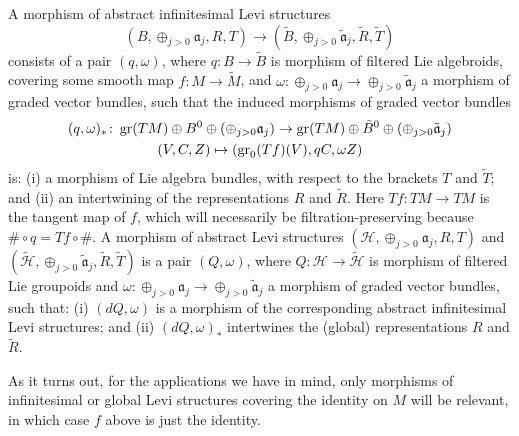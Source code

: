 \documentclass[leqno,12pt]{amsart} %
\begin{document}
A morphism of abstract infinitesimal Levi structures
$$(B, \oplus_{j>0} {\mathfrak a}_j, R, T) \rightarrow
(\tilde B, \oplus_{j>0} \tilde{\mathfrak a}_j, \tilde R, \tilde T)$$ consists of a pair
$(q, \omega)$, where $q \colon B \rightarrow \tilde B$ is morphism of filtered Lie
algebroids, covering some smooth map $f \colon M \rightarrow \tilde M$, and
$\omega \colon \oplus_{j>0}{\mathfrak a}_j \rightarrow \oplus_{j>0}\tilde{\mathfrak a}_j$
a morphism of graded vector bundles, such that the induced morphisms of graded vector
bundles
\begin{gather*}
  (q, \omega)_* \colon \operatorname{\operatorname{gr}}(TM)\oplus B^0 \oplus (\oplus_{j>0}{\mathfrak a}_j)
     \rightarrow \operatorname{\operatorname{gr}}(TM)\oplus \tilde B^0 \oplus (\oplus_{j>0}\tilde{\mathfrak a}_j)\\
  (V, C, Z) \mapsto (\operatorname{\operatorname{gr}}_0(Tf)(V), qC, \omega Z)
\end{gather*}
is: (i) a morphism of Lie algebra bundles, with respect to the brackets $T$ and
$\tilde T$; and (ii) an intertwining of the representations $R$ and $\tilde R$. Here
$Tf \colon TM \rightarrow TM$ is the tangent map of $f$, which will necessarily be
filtration-preserving because $\# \circ q = Tf \circ \#$. A morphism of abstract Levi
structures $({\mathcal H}, \oplus_{j>0}{\mathfrak a}_j, R, T)$ and
$(\tilde {\mathcal H}, \oplus_{j>0}\tilde{\mathfrak a}_j, \tilde R, \tilde T)$ is a pair
$(Q, \omega)$, where $Q \colon {\mathcal H} \rightarrow \tilde {\mathcal H} $ is morphism
of filtered Lie groupoids and
$\omega \colon \oplus_{j>0}{\mathfrak a}_j \rightarrow \oplus_{j>0}\tilde{\mathfrak a}_j$
a morphism of graded vector bundles, such that: (i) $(dQ, \omega)$ is a morphism of the
corresponding abstract infinitesimal Levi structures; and (ii) $(dQ, \omega)_*$
intertwines the (global) representations $R$ and $\tilde R$.

As it turns out, for the applications we have in mind, only morphisms of infinitesimal or
global Levi structures covering the identity on $M$ will be relevant, in which case $f$
above is just the identity.
\end{document}
